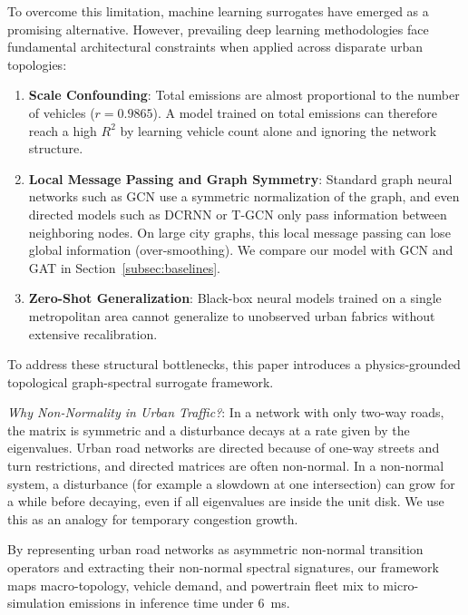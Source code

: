 \documentclass[journal]{IEEEtran}
\begin{document}
To overcome this limitation, machine learning surrogates have emerged as a promising alternative. However, prevailing deep learning methodologies face fundamental architectural constraints when applied across disparate urban topologies:
\begin{enumerate}
    \item \textbf{Scale Confounding}: Total emissions are almost proportional to the number of vehicles ($r = 0.9865$). A model trained on total emissions can therefore reach a high $R^2$ by learning vehicle count alone and ignoring the network structure.
    \item \textbf{Local Message Passing and Graph Symmetry}: Standard graph neural networks such as GCN \cite{Kipf2017} use a symmetric normalization of the graph, and even directed models such as DCRNN \cite{Li2018} or T-GCN \cite{Zhao2020} only pass information between neighboring nodes. On large city graphs, this local message passing can lose global information (over-smoothing). We compare our model with GCN and GAT in Section~\ref{subsec:baselines}.
    \item \textbf{Zero-Shot Generalization}: Black-box neural models trained on a single metropolitan area cannot generalize to unobserved urban fabrics without extensive recalibration.
\end{enumerate}

To address these structural bottlenecks, this paper introduces a physics-grounded topological graph-spectral surrogate framework. 

\textit{Why Non-Normality in Urban Traffic?}: In a network with only two-way roads, the matrix is symmetric and a disturbance decays at a rate given by the eigenvalues. Urban road networks are directed because of one-way streets and turn restrictions, and directed matrices are often non-normal. In a non-normal system, a disturbance (for example a slowdown at one intersection) can grow for a while before decaying, even if all eigenvalues are inside the unit disk. We use this as an analogy for temporary congestion growth.

By representing urban road networks as asymmetric non-normal transition operators and extracting their non-normal spectral signatures, our framework maps macro-topology, vehicle demand, and powertrain fleet mix to micro-simulation emissions in inference time under $6$~ms.
\end{document}
